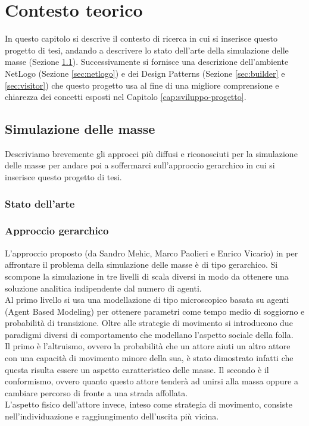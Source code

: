 \chapter{Contesto teorico}
In questo capitolo si descrive il contesto di ricerca in cui si inserisce questo progetto di tesi, andando a descrivere lo stato dell'arte della simulazione delle masse (Sezione \ref{sec:simulazione-masse}). Successivamente si fornisce una descrizione dell'ambiente NetLogo (Sezione \ref{sec:netlogo}) e dei Design Patterns (Sezione \ref{sec:builder} e \ref{sec:visitor}) che questo progetto usa al fine di una migliore comprensione e chiarezza dei concetti esposti nel Capitolo \ref{cap:sviluppo-progetto}.
\section{Simulazione delle masse}
\label{sec:simulazione-masse}
Descriviamo brevemente gli approcci più diffusi e riconosciuti per la simulazione delle masse per andare poi a soffermarci sull'approccio gerarchico in cui si inserisce questo progetto di tesi.
\subsection{Stato dell'arte}

\subsection{Approccio gerarchico}
 L'approccio proposto (da Sandro Mehic, Marco Paolieri e Enrico Vicario) in \cite{hierarchical-report} per affrontare il problema della simulazione delle masse è di tipo gerarchico. Si scompone la simulazione in tre livelli di scala diversi in modo da ottenere una soluzione analitica indipendente dal numero di agenti.\\
 Al primo livello si usa una modellazione di tipo microscopico basata su agenti (Agent Based Modeling) per ottenere parametri come tempo medio di soggiorno e probabilità di transizione. Oltre alle strategie di movimento si introducono due paradigmi diversi di comportamento che modellano l'aspetto sociale della folla.\\
 Il primo è l'altruismo, ovvero la probabilità che un attore aiuti un altro attore con una capacità di movimento minore della sua, è stato dimostrato infatti che questa risulta essere un aspetto caratteristico delle masse. Il secondo è il conformismo, ovvero quanto questo attore tenderà ad unirsi alla massa oppure a cambiare percorso di fronte a una strada affollata.\\
L'aspetto fisico dell'attore invece, inteso come strategia di movimento, consiste nell'individuazione e raggiungimento dell'uscita più vicina.
